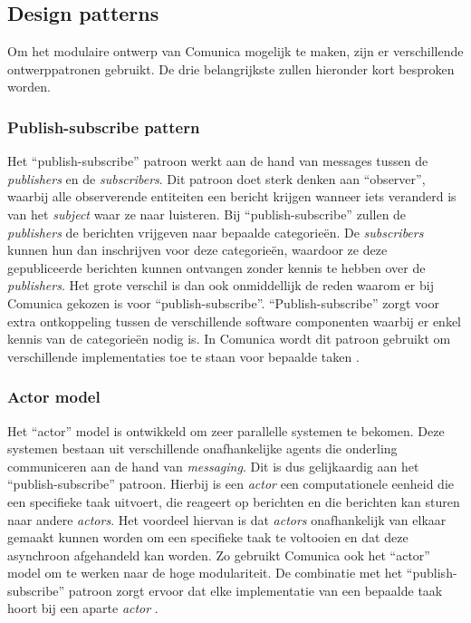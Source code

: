 \subsection{Design patterns}
Om het modulaire ontwerp van Comunica mogelijk te maken, zijn er verschillende ontwerppatronen gebruikt. De drie belangrijkste zullen hieronder kort besproken worden.

\subsubsection{Publish-subscribe pattern}
Het ``publish-subscribe'' patroon werkt aan de hand van messages tussen de \textit{publishers} en de \textit{subscribers}. Dit patroon doet sterk denken aan ``observer'', waarbij alle observerende entiteiten een bericht krijgen wanneer iets veranderd is van het \textit{subject} waar ze naar luisteren. Bij ``publish-subscribe'' zullen de \textit{publishers} de berichten vrijgeven naar bepaalde categorieën. De \textit{subscribers} kunnen hun dan inschrijven voor deze categorieën, waardoor ze deze gepubliceerde berichten kunnen ontvangen zonder kennis te hebben over de \textit{publishers}. Het grote verschil is dan ook onmiddellijk de reden waarom er bij Comunica gekozen is voor ``publish-subscribe''. ``Publish-subscribe'' zorgt voor extra ontkoppeling tussen de verschillende software componenten waarbij er enkel kennis van de categorieën nodig is. In Comunica wordt dit patroon gebruikt om verschillende implementaties toe te staan voor bepaalde taken \cite{taelman2018comunica}.

\subsubsection{Actor model}
Het ``actor'' model is ontwikkeld om zeer parallelle systemen te bekomen. Deze systemen bestaan uit verschillende onafhankelijke agents die onderling communiceren aan de hand van \textit{messaging}. Dit is dus gelijkaardig aan het ``publish-subscribe'' patroon. Hierbij is een \textit{actor} een computationele eenheid die een specifieke taak uitvoert, die reageert op berichten en die berichten kan sturen naar andere \textit{actors}. Het voordeel hiervan is dat \textit{actors} onafhankelijk van elkaar gemaakt kunnen worden om een specifieke taak te voltooien en dat deze asynchroon afgehandeld kan worden. Zo gebruikt Comunica ook het ``actor'' model om te werken naar de hoge modulariteit. De combinatie met het ``publish-subscribe'' patroon zorgt ervoor dat elke implementatie van een bepaalde taak hoort bij een aparte \textit{actor} \cite{taelman2018comunica}.

